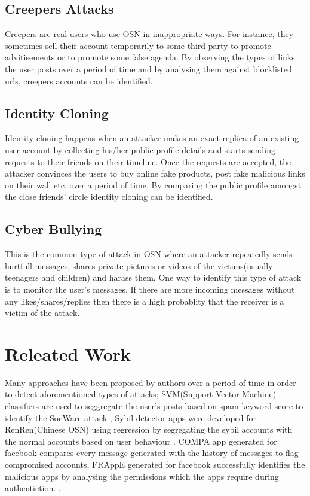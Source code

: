 \documentclass[conference]{IEEEtran}
\begin{document}
\subsection{Creepers Attacks}
Creepers are real users who use OSN in inappropriate ways. For instance, they sometimes sell their account temporarily to some third party to promote advitisements or to promote some false agenda. By observing the types of links the user posts over a period of time and by analysing them against blocklisted urls, creepers accounts can be identified.

\subsection{Identity Cloning}
Identity cloning happens when an attacker makes an exact replica of an existing user account by collecting his/her public profile details and starts sending requests to their friends on their timeline. Once the requests are accepted, the attacker convinces the users to buy online fake products, post fake malicious links on their wall etc. over a period of time. By comparing the public profile amongst the close friends' circle identity cloning can be identified.

\subsection{Cyber Bullying}
This is the common type of attack in OSN where an attacker repeatedly sends hurtfull messages, shares private pictures or videos of the victims(usually teenagers and children) and harass them. One way to identify this type of attack is to monitor the user's messages. If there are more incoming messages without any likes/shares/replies then there is a high probablity that the receiver is a victim of the attack.

\section{Releated Work}
Many approaches have been proposed by authors over a period of time in order to detect aforementioned types of attacks; SVM(Support Vector Machine) classifiers are used to seggregate the user's posts based on spam keyword score to identify the SocWare attack \cite{1}, Sybil detector apps were developed for RenRen(Chinese OSN) using regression by segregating the sybil accounts with the normal accounts based on user behaviour \cite{2} \cite{3}. COMPA app generated for facebook compares every message generated with the history of messages to flag compromised accounts, FRAppE generated for facebook successfully identifies the malicious apps by analysing the permissions which the apps require during authentiction. \cite{4}.
\end{document}
